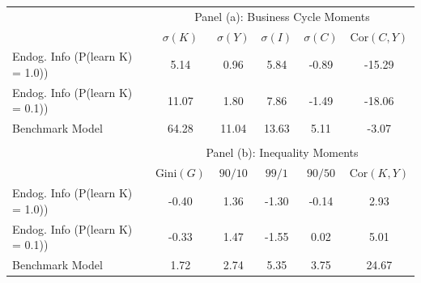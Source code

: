 \begin{tabular}{lccccc}
\toprule
\toprule
&\multicolumn{5}{c}{Panel (a): Business Cycle Moments}\\
& $\sigma(K)$ & $\sigma(Y)$ & $\sigma(I)$ & $\sigma(C)$ & $\text{Cor}(C,Y)$\\
\midrule
Endog. Info (P(learn K) = 1.0)) & 5.14 & 0.96 & 5.84 & -0.89 & -15.29 \\
[1em] Endog. Info (P(learn K) = 0.1)) & 11.07 & 1.80 & 7.86 & -1.49 & -18.06 \\
[1em] Benchmark Model & 64.28 & 11.04 & 13.63 & 5.11 & -3.07 \\
\midrule
& \multicolumn{5}{c}{}\\
&\multicolumn{5}{c}{Panel (b): Inequality Moments}\\
& $\text{Gini}(G)$ & $90/10$ & $99/1$ & $90/50$ & $\text{Cor}(K,Y)$\\
\midrule
Endog. Info (P(learn K) = 1.0)) & -0.40 & 1.36 & -1.30 & -0.14 & 2.93 \\
[1em] Endog. Info (P(learn K) = 0.1)) & -0.33 & 1.47 & -1.55 & 0.02 & 5.01 \\
[1em] Benchmark Model & 1.72 & 2.74 & 5.35 & 3.75 & 24.67 \\
\bottomrule
\bottomrule
\end{tabular}
